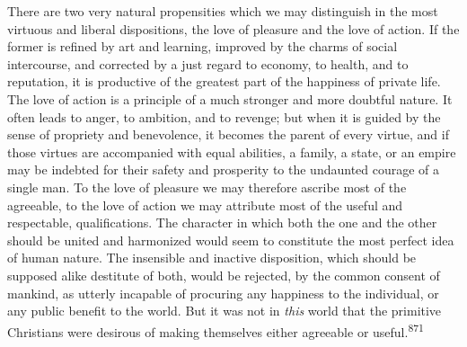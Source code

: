 There are two very natural propensities which we may distinguish
in the most virtuous and liberal dispositions, the love of
pleasure and the love of action. If the former is refined by art
and learning, improved by the charms of social intercourse, and
corrected by a just regard to economy, to health, and to
reputation, it is productive of the greatest part of the
happiness of private life. The love of action is a principle of a
much stronger and more doubtful nature. It often leads to anger,
to ambition, and to revenge; but when it is guided by the sense
of propriety and benevolence, it becomes the parent of every
virtue, and if those virtues are accompanied with equal
abilities, a family, a state, or an empire may be indebted for
their safety and prosperity to the undaunted courage of a single
man. To the love of pleasure we may therefore ascribe most of the
agreeable, to the love of action we may attribute most of the
useful and respectable, qualifications. The character in which
both the one and the other should be united and harmonized would
seem to constitute the most perfect idea of human nature. The
insensible and inactive disposition, which should be supposed
alike destitute of both, would be rejected, by the common consent
of mankind, as utterly incapable of procuring any happiness to
the individual, or any public benefit to the world. But it was
not in \textit{this} world that the primitive Christians were desirous
of making themselves either agreeable or useful.\textsuperscript{871}



